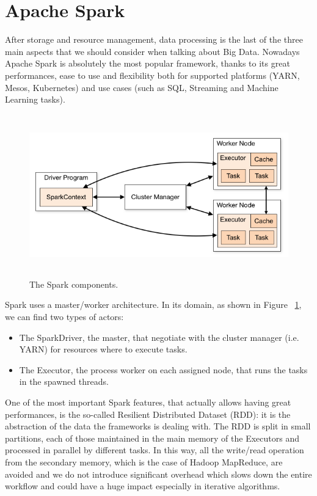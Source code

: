 \documentclass[12pt,twoside,cucitura]{toptesi}
\begin{document}
\section{Apache Spark}
After storage and resource management, data processing is the last of the three main aspects that we should consider when talking about Big Data. Nowadays Apache Spark \cite{spark} is absolutely the most popular framework, thanks to its great performances, ease to use and flexibility both for supported platforms (YARN, Mesos, Kubernetes) and use cases (such as SQL, Streaming and Machine Learning tasks).
\begin{figure}
\centering
\includegraphics[height=70mm]{spark-architecture}
\caption{The Spark components.}\label{fig:spark-architecture}
\end{figure}
Spark uses a master/worker architecture. In its domain, as shown in Figure ~\ref{fig:spark-architecture}, we can find two types of actors:
\begin{itemize}
  \item The SparkDriver, the master, that negotiate with the cluster manager (i.e. YARN) for resources where to execute tasks.  
  \item The Executor, the process worker on each assigned node, that runs the tasks in the spawned threads.
\end{itemize}
One of the most important Spark features, that actually allows having great performances, is the so-called Resilient Distributed Dataset (RDD): it is the abstraction of the data the frameworks is dealing with. The RDD is split in small partitions, each of those maintained in the main memory of the Executors and processed in parallel by different tasks. In this way, all the write/read operation from the secondary memory, which is the case of Hadoop MapReduce, are avoided and we do not introduce significant overhead which slows down the entire workflow and could have a huge impact especially in iterative algorithms.
\end{document}
